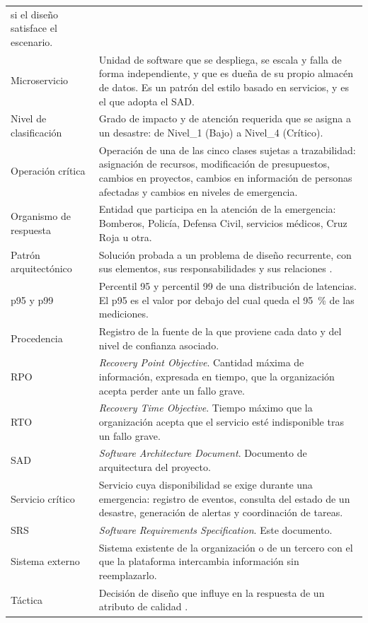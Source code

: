 \documentclass[11pt,letterpaper]{article}
\begin{document}
\begin{longtable}{L{3.6cm} L{12.4cm}}
si el diseño satisface el escenario. \\
Microservicio & Unidad de software que se despliega, se escala y falla de forma independiente, y que
es dueña de su propio almacén de datos. Es un patrón del estilo basado en servicios, y es el que
adopta el SAD. \\
Nivel de clasificación & Grado de impacto y de atención requerida que se asigna a un desastre:
de Nivel\_1 (Bajo) a Nivel\_4 (Crítico). \\
Operación crítica & Operación de una de las cinco clases sujetas a trazabilidad: asignación de
recursos, modificación de presupuestos, cambios en proyectos, cambios en información de personas
afectadas y cambios en niveles de emergencia. \\
Organismo de respuesta & Entidad que participa en la atención de la emergencia: Bomberos, Policía,
Defensa Civil, servicios médicos, Cruz Roja u otra. \\
Patrón arquitectónico & Solución probada a un problema de diseño recurrente, con sus elementos, sus
responsabilidades y sus relaciones \cite{bass}. \\
p95 y p99 & Percentil 95 y percentil 99 de una distribución de latencias. El p95 es el valor por
debajo del cual queda el \qty{95}{\percent} de las mediciones. \\
Procedencia & Registro de la fuente de la que proviene cada dato y del nivel de confianza asociado. \\
RPO & \emph{Recovery Point Objective}. Cantidad máxima de información, expresada en tiempo, que la
organización acepta perder ante un fallo grave. \\
RTO & \emph{Recovery Time Objective}. Tiempo máximo que la organización acepta que el servicio esté
indisponible tras un fallo grave. \\
SAD & \emph{Software Architecture Document}. Documento de arquitectura del proyecto. \\
Servicio crítico & Servicio cuya disponibilidad se exige durante una emergencia: registro de
eventos, consulta del estado de un desastre, generación de alertas y coordinación de tareas. \\
SRS & \emph{Software Requirements Specification}. Este documento. \\
Sistema externo & Sistema existente de la organización o de un tercero con el que la plataforma
intercambia información sin reemplazarlo. \\
Táctica & Decisión de diseño que influye en la respuesta de un atributo de calidad \cite{bass}. \\
\end{longtable}
\end{document}
